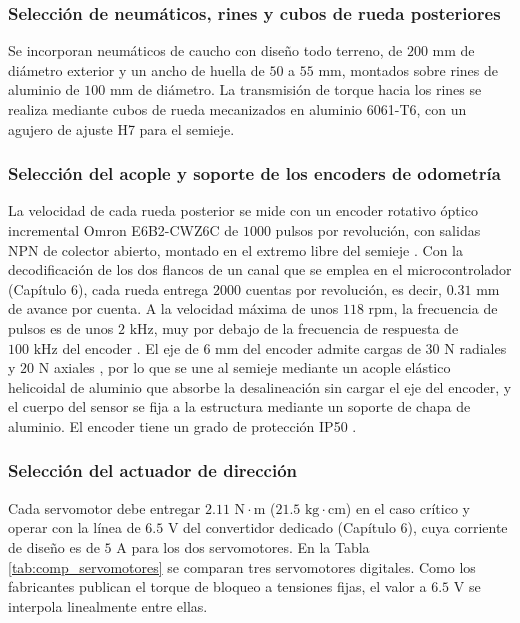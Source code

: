 \documentclass[../../General.tex]{subfiles}
\begin{document}
\subsubsection{Selección de neumáticos, rines y cubos de rueda posteriores}
Se incorporan neumáticos de caucho con diseño todo terreno, de $200\text{ mm}$ de diámetro exterior y un ancho de huella de $50$ a $55\text{ mm}$, montados sobre rines de aluminio de $100\text{ mm}$ de diámetro. La transmisión de torque hacia los rines se realiza mediante cubos de rueda mecanizados en aluminio 6061-T6, con un agujero de ajuste H7 \citep{iso286_2_2010} para el semieje.

\subsubsection{Selección del acople y soporte de los encoders de odometría}
La velocidad de cada rueda posterior se mide con un encoder rotativo óptico incremental Omron E6B2-CWZ6C de $1000$ pulsos por revolución, con salidas NPN de colector abierto, montado en el extremo libre del semieje \citep{omron_e6b2}. Con la decodificación de los dos flancos de un canal que se emplea en el microcontrolador (Capítulo 6), cada rueda entrega $2000$ cuentas por revolución, es decir, $0.31\text{ mm}$ de avance por cuenta. A la velocidad máxima de unos $118\text{ rpm}$, la frecuencia de pulsos es de unos $2\text{ kHz}$, muy por debajo de la frecuencia de respuesta de $100\text{ kHz}$ del encoder \citep{omron_e6b2}. El eje de $6\text{ mm}$ del encoder admite cargas de $30\text{ N}$ radiales y $20\text{ N}$ axiales \citep{omron_e6b2}, por lo que se une al semieje mediante un acople elástico helicoidal de aluminio que absorbe la desalineación sin cargar el eje del encoder, y el cuerpo del sensor se fija a la estructura mediante un soporte de chapa de aluminio. El encoder tiene un grado de protección IP50 \citep{omron_e6b2}.

\subsubsection{Selección del actuador de dirección}

Cada servomotor debe entregar $2.11\text{ N}\cdot\text{m}$ ($21.5\text{ kg}\cdot\text{cm}$) en el caso crítico y operar con la línea de $6.5\text{ V}$ del convertidor dedicado (Capítulo 6), cuya corriente de diseño es de $5\text{ A}$ para los dos servomotores. En la Tabla \ref{tab:comp_servomotores} se comparan tres servomotores digitales. Como los fabricantes publican el torque de bloqueo a tensiones fijas, el valor a $6.5\text{ V}$ se interpola linealmente entre ellas.
\end{document}
